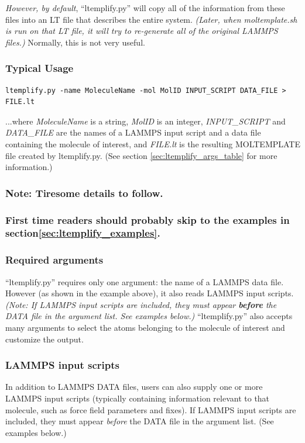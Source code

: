\documentclass[11pt]{article}
\begin{document}
\textit{However, by default}, ``ltemplify.py'' will copy all of the information
from these files into an LT file that
describes the entire system.
\textit{(Later, when moltemplate.sh is run on that LT file,
  it will try to re-generate all of the original LAMMPS files.)}
Normally, this is not very useful.


\subsubsection*{Typical Usage}
\begin{verbatim}
ltemplify.py -name MoleculeName -mol MolID INPUT_SCRIPT DATA_FILE > FILE.lt
\end{verbatim}
...where \textit{MoleculeName} is a string,
\textit{MolID} is an integer,
\textit{INPUT\_SCRIPT} and \textit{DATA\_FILE}
are the names of a LAMMPS input script and a data file
containing the molecule of interest,
and \textit{FILE.lt} is the resulting
MOLTEMPLATE file created by ltemplify.py.
(See section \ref{sec:ltemplify_args_table} for more information.)

\subsubsection*{Note: Tiresome details to follow.}
\subsubsection*{First time readers should probably skip to
the examples in section\ref{sec:ltemplify_examples}.}

\subsubsection*{Required arguments}

``ltemplify.py'' requires only one argument: the name of a LAMMPS data file.
However (as shown in the example above), it also reads LAMMPS input scripts.
\textit{(Note: If LAMMPS input scripts are included, they must appear
\textbf{before} the DATA file in the argument list.  See examples below.)}
``ltemplify.py'' also accepts many arguments to select the atoms belonging
to the molecule of interest and customize the output.

\subsubsection*{LAMMPS input scripts}

In addition to LAMMPS DATA files, users can also supply
one or more LAMMPS input scripts
(typically containing information relevant to that molecule,
such as force field parameters and fixes).
If LAMMPS input scripts are included, they must appear \textit{before}
the DATA file in the argument list. (See examples below.)
\end{document}
